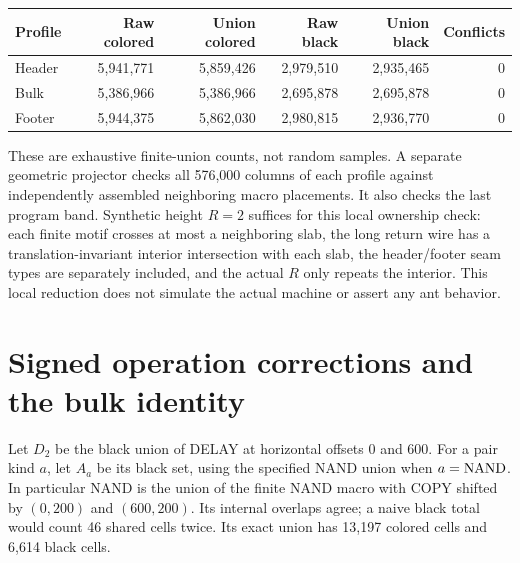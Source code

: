 \documentclass[11pt,letterpaper]{article}
\theoremstyle{definition}\newtheorem{definition}[theorem]{Definition}
\theoremstyle{remark}\newtheorem{remark}[theorem]{Remark}
\begin{document}
\begin{center}\small
\begin{tabular}{@{}lrrrrr@{}}\toprule
Profile&Raw colored&Union colored&Raw black&Union black&Conflicts\\\midrule
Header&5,941,771&5,859,426&2,979,510&2,935,465&0\\
Bulk&5,386,966&5,386,966&2,695,878&2,695,878&0\\
Footer&5,944,375&5,862,030&2,980,815&2,936,770&0\\\bottomrule
\end{tabular}\end{center}
These are exhaustive finite-union counts, not random samples. A separate geometric projector checks all 576,000 columns of each profile against independently assembled neighboring macro placements. It also checks the last program band. Synthetic height $R=2$ suffices for this local ownership check: each finite motif crosses at most a neighboring slab, the long return wire has a translation-invariant interior intersection with each slab, the header/footer seam types are separately included, and the actual $R$ only repeats the interior. This local reduction does not simulate the actual machine or assert any ant behavior.

\section{Signed operation corrections and the bulk identity}\label{ptr:sc:sec:correction}
Let $D_2$ be the black union of DELAY at horizontal offsets 0 and 600. For a pair kind $a$, let $A_a$ be its black set, using the specified NAND union when $a=\mathrm{NAND}$. In particular NAND is the union of the finite NAND macro with COPY shifted by $(0,200)$ and $(600,200)$. Its internal overlaps agree; a naive black total would count 46 shared cells twice. Its exact union has 13,197 colored cells and 6,614 black cells.
\end{document}
